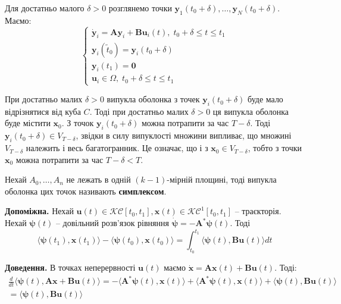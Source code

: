 \documentclass[14pt]{extarticle}
\newcommand{\<}{\langle}
\renewcommand{\>}{\rangle}
\theoremstyle{mystyle}{\newtheorem{definition}{Definition}[section]}
\theoremstyle{mystyle}{\newtheorem{proposition}[definition]{Proposition}}
\theoremstyle{mystyle}{\newtheorem{theorem}[definition]{Theorem}}
\theoremstyle{mystyle}{\newtheorem{lemma}[definition]{Lemma}}
\theoremstyle{mystyle}{\newtheorem{corollary}[definition]{Corollary}}
\theoremstyle{mystyle}{\newtheorem*{remark}{Remark}}
\theoremstyle{mystyle}{\newtheorem*{remarks}{Remarks}}
\theoremstyle{mystyle}{\newtheorem*{example}{Example}}
\theoremstyle{mystyle}{\newtheorem*{examples}{Examples}}
\theoremstyle{definition}{\newtheorem*{exercise}{Exercise}}
\theoremstyle{cstyle}{\newtheorem*{cthm}{}}
\theoremstyle{warn}
\begin{document}
Для достатньо малого $\delta>0$ розглянемо точки $\mathbf{y}_1(t_0+\delta),\dots,\mathbf{y}_N(t_0+\delta)$. Маємо:
\begin{equation}
    \begin{cases}
        \dot{\mathbf{y}}_i = \boldsymbol{A}\mathbf{y}_i + \boldsymbol{B}\mathbf{u}_i(t), \; t_0+\delta \leq t \leq t_1 \\
        \mathbf{y}_i(\widetilde{t}_0) = \mathbf{y}_i(t_0+\delta) \\
        \mathbf{y}_i(t_1) = \mathbf{0} \\
        \mathbf{u}_i \in \Omega, \; t_0+\delta \leq t \leq t_1
    \end{cases}
\end{equation}

При достатньо малих $\delta>0$ випукла оболонка з точек $\mathbf{y}_i(t_0+\delta)$ буде мало відрізнятися від куба $C$. Тоді при достатньо 
малих $\delta>0$ ця випукла оболонка буде містити $\mathbf{x}_0$. З точок $\mathbf{y}_i(t_0+\delta)$ можна потрапити за час $T-\delta$. Тоді $\mathbf{y}_i(t_0+\delta) \in V_{T-\delta}$, звідки 
в силу випуклості множини випливає, що множині $V_{T-\delta}$ належить і весь багатогранник. Це означає, що і з $\mathbf{x}_0 \in V_{T-\delta}$, тобто з точки $\mathbf{x}_0$ можна потрапити за час $T-\delta < T$. 

\begin{definition}
    Нехай $A_0,\dots,A_n$ не лежать в одній $(k-1)$-мірній площині, тоді випукла оболонка цих точок називають \textbf{симплексом}.
\end{definition}

\begin{lemma}
    \textbf{Допоміжна.} Нехай $\mathbf{u}(t) \in \mathcal{KC}[t_0,t_1],\mathbf{x}(t) \in \mathcal{KC}^1[t_0,t_1]$ -- траєкторія. Нехай $\boldsymbol{\psi}(t)$ -- довільний розв'язок рівняння $\dot{\boldsymbol{\psi}}=-\boldsymbol{A}^{*}\boldsymbol{\psi}(t)$. Тоді
    \begin{equation}
        \langle \boldsymbol{\psi}(t_1),\mathbf{x}(t_1) \rangle - \langle \boldsymbol{\psi}(t_0),\mathbf{x}(t_0) \rangle = \int_{t_0}^{t_1} \langle \boldsymbol{\psi}(t), \boldsymbol{B}\mathbf{u}(t) \rangle dt
    \end{equation}
\end{lemma}

\textbf{Доведення.} В точках неперервності $\mathbf{u}(t)$ маємо $\dot{\mathbf{x}} = \boldsymbol{A}\mathbf{x}(t)+\boldsymbol{B}\mathbf{u}(t)$. Тоді:
\begin{align}
    \frac{d}{dt} \langle \boldsymbol{\psi}(t), \boldsymbol{A}\mathbf{x}+\boldsymbol{B}\mathbf{u}(t) \rangle = -\langle \boldsymbol{A}^*\boldsymbol{\psi}(t),\mathbf{x}(t) \rangle + \langle \boldsymbol{A}^*\boldsymbol{\psi}(t),\mathbf{x}(t) \rangle + \langle \boldsymbol{\psi}(t), \boldsymbol{B}\mathbf{u}(t) \rangle \\= \langle \boldsymbol{\psi}(t), \boldsymbol{B}\mathbf{u}(t) \rangle
\end{align}
\end{document}

